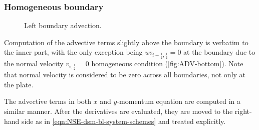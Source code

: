 \documentclass{article}
\numberwithin{equation}{section}
\begin{document}
\subsubsection{Homogeneous boundary}\label{subsubsec:advection-left-bottom}
\begin{figure}[H] %
  \caption{Left boundary advection.}
\end{figure}

Computation of the advective terms slightly above the boundary is verbatim to the inner part, with the only exception being $uv_{i-\frac{1}{2},\frac{1}{2}}=0$ at the boundary due to the normal velocity $v_{i,\frac{1}{2}}=0$ homogeneous condition (\cref{fig:ADV-bottom}). Note that normal velocity is considered to be zero across all boundaries, not only at the plate. 

The advective terms in both  $x$ and $y$-momentum equation are computed in a similar manner. After the derivatives are evaluated, they are moved to the right-hand side as in \cref{eqn:NSE-dsm-bl-system-schemes} and treated explicitly. 
\end{document}
